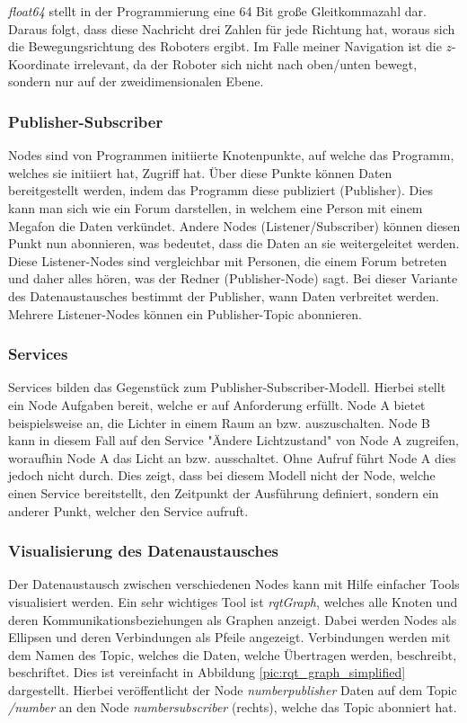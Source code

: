 {{{			\emph{float64} stellt in der Programmierung eine 64 Bit große Gleitkommazahl dar. Daraus folgt, dass diese Nachricht drei Zahlen für jede Richtung hat, woraus sich die Bewegungsrichtung des Roboters ergibt. Im Falle meiner Navigation ist die $z$-Koordinate irrelevant, da der Roboter sich nicht nach oben/unten bewegt, sondern nur auf der zweidimensionalen Ebene. \parencite{roswikimesgs}
		}
		
		\subsubsection{Publisher-Subscriber}
		{
			Nodes sind von Programmen initiierte Knotenpunkte, auf welche das Programm, welches sie initiiert hat, Zugriff hat. Über diese Punkte können Daten bereitgestellt werden, indem das Programm diese publiziert (Publisher). Dies kann man sich wie ein Forum darstellen, in welchem eine Person mit einem Megafon die Daten verkündet. Andere Nodes (Listener/Subscriber) können diesen Punkt nun abonnieren, was bedeutet, dass die Daten an sie weitergeleitet werden. Diese Listener-Nodes sind vergleichbar mit Personen, die einem Forum betreten und daher alles hören, was der Redner (Publisher-Node) sagt. Bei dieser Variante des Datenaustausches bestimmt der Publisher, wann Daten verbreitet werden. Mehrere Listener-Nodes können ein Publisher-Topic abonnieren. \parencite{rosgenerationrobotics}
		}
		\subsubsection{Services}
		{ 
			Services bilden das Gegenstück zum Publisher-Subscriber-Modell. Hierbei stellt ein Node Aufgaben bereit, welche er auf Anforderung erfüllt. Node A bietet beispielsweise an, die Lichter in einem Raum an bzw. auszuschalten. Node B kann in diesem Fall auf den Service "Ändere Lichtzustand" von Node A zugreifen, woraufhin Node A das Licht an bzw. ausschaltet. Ohne Aufruf führt Node A dies jedoch nicht durch. Dies zeigt, dass bei diesem Modell nicht der Node, welche einen Service bereitstellt, den Zeitpunkt der Ausführung definiert, sondern ein anderer Punkt, welcher den Service aufruft. \parencite{rosgenerationrobotics}
		}
		
		\subsubsection{Visualisierung des Datenaustausches}
		{
			Der Datenaustausch zwischen verschiedenen Nodes kann mit Hilfe einfacher Tools visualisiert werden. Ein sehr wichtiges Tool ist \emph{rqt\textunderscore Graph}, welches alle Knoten und deren Kommunikationsbeziehungen als Graphen anzeigt. Dabei werden Nodes als Ellipsen und deren Verbindungen als Pfeile angezeigt. Verbindungen werden mit dem Namen des Topic, welches die Daten, welche Übertragen werden, beschreibt, beschriftet. Dies ist vereinfacht in Abbildung \ref{pic:rqt_graph_simplified} dargestellt. Hierbei veröffentlicht der Node \emph{number\textunderscore publisher} Daten auf dem Topic \emph{/number} an den Node \emph{number\textunderscore subscriber} (rechts), welche das Topic abonniert hat.
			
}}}
